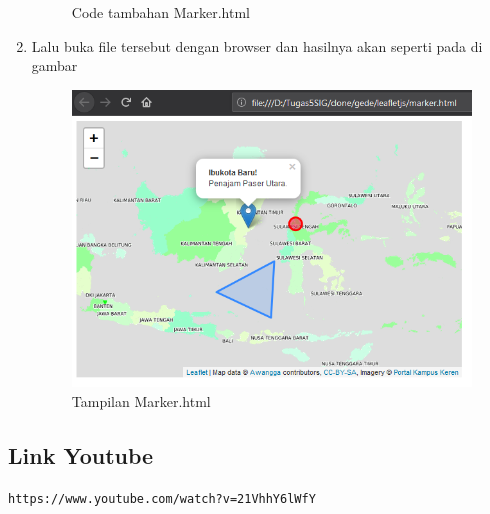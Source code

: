 \begin{enumerate}
\begin{figure}[H]
		\centering
		\caption{Code tambahan Marker.html}
	\end{figure}
    \item Lalu buka file tersebut dengan browser dan hasilnya akan seperti pada di gambar
    \hfill\break
    \begin{figure}[H]
		\includegraphics[width=12cm]{figures/Tugas5/1174089/5.png}
		\centering
		\caption{Tampilan Marker.html}
	\end{figure}
\end{enumerate}
\subsection{Link Youtube}
\verb|https://www.youtube.com/watch?v=21VhhY6lWfY|